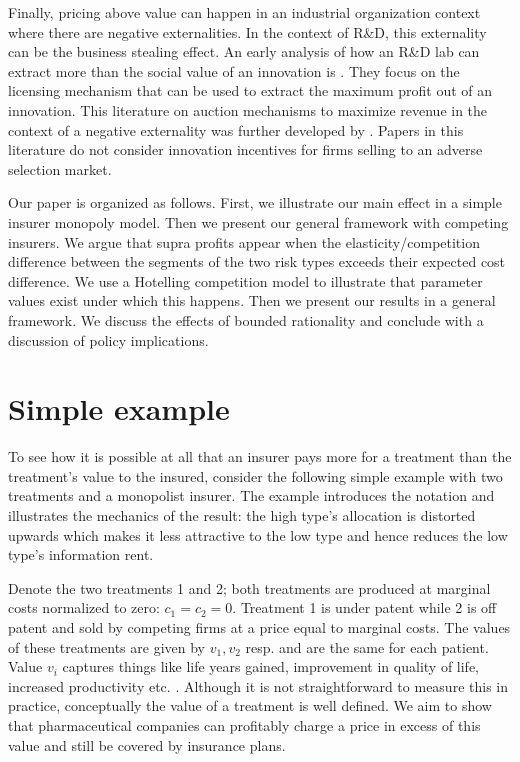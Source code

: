\documentclass[a4paper,12pt]{article}
\begin{document}
Finally, pricing above value can happen in an industrial organization context where there are negative externalities. In the context of R\&D, this externality can be the business stealing effect. An early analysis of how an R\&D lab can extract more than the social value of an innovation is \cite{KatzShapiro1986}. They focus on the licensing mechanism that can be used to extract the maximum profit out of an innovation. This literature on auction mechanisms to maximize revenue in the context of a negative externality was further developed by \cite{jehiel1996}. Papers in this literature do not consider innovation incentives for firms selling to an adverse selection market.

Our paper is organized as follows. First, we illustrate our main effect in a simple insurer monopoly model. Then we present our general framework with competing insurers. We argue that supra profits appear when the elasticity/competition difference between the segments of the two risk types exceeds their expected cost difference. We use a Hotelling competition model to illustrate that parameter values exist under which this happens. Then we present our results in a general framework. We discuss the effects of bounded rationality and conclude with a discussion of policy implications.

\section{Simple example}
\label{sec:org6142676}

To see how it is possible at all that an insurer pays more for a treatment than the treatment's value to the insured, consider the following simple example with two treatments and a monopolist insurer. The example introduces the notation and illustrates the mechanics of the result: the high type's allocation is distorted upwards which makes it less attractive to the low type and hence reduces the low type's information rent.

Denote the two treatments 1 and 2; both treatments are produced at marginal costs normalized to zero: \(c_1 = c_2 =0\). Treatment 1 is under patent while 2 is off patent and sold by competing firms at a price equal to marginal costs. The values of these treatments are given by \(v_1,v_2\) resp. and are the same for each patient. Value \(v_i\) captures things like life years gained, improvement in quality of life, increased productivity etc. \citep{Garrison2017}. Although it is not straightforward to measure this in practice, conceptually the value of a treatment is well defined. We aim to show that pharmaceutical companies can profitably charge a price in excess of this value and still be covered by insurance plans.
\end{document}
